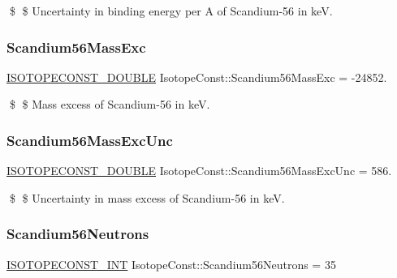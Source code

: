 \$ \$ Uncertainty in binding energy per A of Scandium-\/56 in keV. \mbox{\label{group___isotope_const-_scandium-_sc56_gae502c5d7c4469d9b89ec7a94c2eb7e3d}} 
\subsubsection{\texorpdfstring{Scandium56\+Mass\+Exc}{Scandium56MassExc}}
{\footnotesize\ttfamily \mbox{\hyperlink{group___isotope_const-_macros_ga8f45a7272ce02c0b4c65c44636ed719a}{I\+S\+O\+T\+O\+P\+E\+C\+O\+N\+S\+T\+\_\+\+D\+O\+U\+B\+LE}} Isotope\+Const\+::\+Scandium56\+Mass\+Exc = -\/24852.}

\$ \$ Mass excess of Scandium-\/56 in keV. \mbox{\label{group___isotope_const-_scandium-_sc56_ga3a8a77c797585ffdff78a632eea79a17}} 
\subsubsection{\texorpdfstring{Scandium56\+Mass\+Exc\+Unc}{Scandium56MassExcUnc}}
{\footnotesize\ttfamily \mbox{\hyperlink{group___isotope_const-_macros_ga8f45a7272ce02c0b4c65c44636ed719a}{I\+S\+O\+T\+O\+P\+E\+C\+O\+N\+S\+T\+\_\+\+D\+O\+U\+B\+LE}} Isotope\+Const\+::\+Scandium56\+Mass\+Exc\+Unc = 586.}

\$ \$ Uncertainty in mass excess of Scandium-\/56 in keV. \mbox{\label{group___isotope_const-_scandium-_sc56_ga81951ea0183fdbb4b159059eda60f0a5}} 
\subsubsection{\texorpdfstring{Scandium56\+Neutrons}{Scandium56Neutrons}}
{\footnotesize\ttfamily \mbox{\hyperlink{group___isotope_const-_macros_ga5f18360b3e99483a35c32d789e62621c}{I\+S\+O\+T\+O\+P\+E\+C\+O\+N\+S\+T\+\_\+\+I\+NT}} Isotope\+Const\+::\+Scandium56\+Neutrons = 35}

